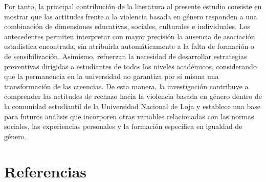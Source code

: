 \documentclass[
  spanish,
  11pt,
  letterpaper,
  DIV=11,
  numbers=noendperiod]{scrreprt}
\begin{document}
Por tanto, la principal contribución de la literatura al presente
estudio consiste en mostrar que las actitudes frente a la violencia
basada en género responden a una combinación de dimensiones educativas,
sociales, culturales e individuales. Los antecedentes permiten
interpretar con mayor precisión la ausencia de asociación estadística
encontrada, sin atribuirla automáticamente a la falta de formación o de
sensibilización. Asimismo, refuerzan la necesidad de desarrollar
estrategias preventivas dirigidas a estudiantes de todos los niveles
académicos, considerando que la permanencia en la universidad no
garantiza por sí misma una transformación de las creencias. De esta
manera, la investigación contribuye a comprender las actitudes de
rechazo hacia la violencia basada en género dentro de la comunidad
estudiantil de la Universidad Nacional de Loja y establece una base para
futuros análisis que incorporen otras variables relacionadas con las
normas sociales, las experiencias personales y la formación específica
en igualdad de género.


\chapter*{Referencias}\label{referencias}

\end{document}
